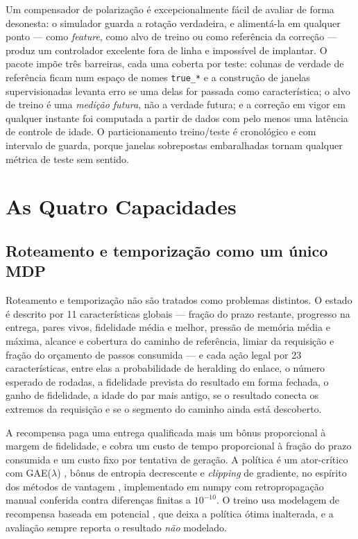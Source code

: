 \documentclass[12pt]{article}
\begin{document}
Um compensador de polarização é excepcionalmente fácil de avaliar de forma
desonesta: o simulador guarda a rotação verdadeira, e alimentá-la em qualquer
ponto --- como \emph{feature}, como alvo de treino ou como referência da
correção --- produz um controlador excelente fora de linha e impossível de
implantar. O pacote impõe três barreiras, cada uma coberta por teste: colunas
de verdade de referência ficam num espaço de nomes \texttt{true\_*} e a
construção de janelas supervisionadas levanta erro se uma delas for passada
como característica; o alvo de treino é uma \emph{medição futura}, não a
verdade futura; e a correção em vigor em qualquer instante foi computada a
partir de dados com pelo menos uma latência de controle de idade. O
particionamento treino/teste é cronológico e com intervalo de guarda, porque
janelas sobrepostas embaralhadas tornam qualquer métrica de teste sem sentido.

\section{As Quatro Capacidades}

\subsection{Roteamento e temporização como um único MDP}

Roteamento e temporização não são tratados como problemas distintos. O estado é
descrito por 11 características globais --- fração do prazo restante, progresso
na entrega, pares vivos, fidelidade média e melhor, pressão de memória média e
máxima, alcance e cobertura do caminho de referência, limiar da requisição e
fração do orçamento de passos consumida --- e cada ação legal por 23
características, entre elas a probabilidade de heralding do enlace, o número
esperado de rodadas, a fidelidade prevista do resultado em forma fechada, o
ganho de fidelidade, a idade do par mais antigo, se o resultado conecta os
extremos da requisição e se o segmento do caminho ainda está descoberto.

A recompensa paga uma entrega qualificada mais um bônus proporcional à margem
de fidelidade, e cobra um custo de tempo proporcional à fração do prazo
consumida e um custo fixo por tentativa de geração. A política é um
ator-crítico com GAE($\lambda$) \cite{schulman2016}, bônus de entropia
decrescente e \emph{clipping} de gradiente, no espírito dos métodos de vantagem
\cite{mnih2016}, implementado em numpy com retropropagação manual conferida
contra diferenças finitas a $10^{-10}$. O treino usa modelagem de recompensa
baseada em potencial \cite{ng1999}, que deixa a política ótima inalterada, e a
avaliação sempre reporta o resultado \emph{não} modelado.
\end{document}
